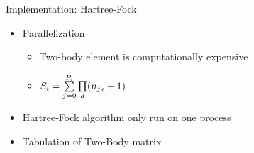 \documentclass[10pt, t]{beamer}
\begin{document}
\begin{frame}[fragile]{Implementation: Hartree-Fock}
{\begin{figure}[H]
    \end{figure}}
    \begin{itemize}
        \item<2-> Parallelization
            \begin{itemize}[<3->]
                \item Two-body element is computationally expensive
                \item $S_i = \suml{j=0}{P_i} \prod\limits_d (n_{j_d}+1)$
            \end{itemize}
        \item<4-> Hartree-Fock algorithm only run on one process
        \item<5-> Tabulation of Two-Body matrix
    \end{itemize}
\end{frame}
\end{document}
